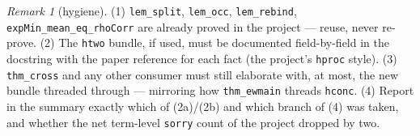 \documentclass[11pt]{article}
\theoremstyle{plain}
\theoremstyle{remark}
\newtheorem{remark}{Remark}
\begin{document}
\begin{remark}[hygiene]
(1) \texttt{lem\_split}, \texttt{lem\_occ}, \texttt{lem\_rebind},
\texttt{expMin\_mean\_eq\_rhoCorr} are already proved in the project ---
reuse, never re-prove. (2) The \texttt{htwo} bundle, if used, must be
documented field-by-field in the docstring with the paper reference for each
fact (the project's \texttt{hproc} style). (3) \texttt{thm\_cross} and any
other consumer must still elaborate with, at most, the new bundle threaded
through --- mirroring how \texttt{thm\_ewmain} threads \texttt{hconc}.
(4) Report in the summary exactly which of (2a)/(2b) and which branch of (4)
was taken, and whether the net term-level \texttt{sorry} count of the
project dropped by two.
\end{remark}
\end{document}
